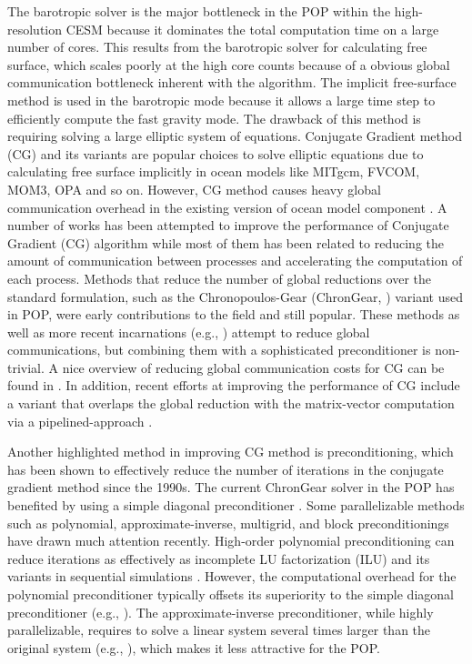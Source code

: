 
The barotropic solver is the major bottleneck in the POP within the high-resolution CESM because it dominates the total computation time on a large number of cores.
This results from the barotropic solver for calculating free surface, which scales poorly at the high core counts because of a obvious global communication bottleneck inherent with the algorithm.
The implicit free-surface method is used in the barotropic mode because it allows a large time step to efficiently compute the fast gravity mode.
The drawback of this method is requiring solving a large elliptic system of equations.
Conjugate Gradient method (CG) and its variants are popular choices to solve elliptic equations due to calculating free surface implicitly in ocean models like MITgcm\citep{adcroft2014mitgcm}, FVCOM\citep{lai2010nonhydrostatic}, MOM3\citep{pacanowsky1999mom3}, OPA \citep{madec1997ocean} and so on.
However, CG method causes heavy global communication overhead in the existing version of ocean model component \citep{Worley:2011:PCE:2063384.2063457}.
A number of works has been attempted to improve the performance of Conjugate Gradient (CG) algorithm while most of them has been related to reducing the amount of communication between processes and accelerating the computation of each process.
Methods that reduce the number of global reductions over the standard formulation, such as the Chronopoulos-Gear (ChronGear, \cite{dAzevedo1999lapack}) variant used in POP, were early contributions to the field and still popular.
These methods as well as more recent incarnations (e.g.,  \cite{hoemmen2010}) attempt to reduce global communications, but combining them with a sophisticated preconditioner is non-trivial. A nice overview of reducing global communication costs for CG can be found in \cite{ghysels2014}. In addition, recent efforts at improving the performance of CG include a variant that overlaps the global reduction with the matrix-vector computation via a pipelined-approach \citep{ghysels2014}.

Another highlighted method in improving CG method is preconditioning,
which has been shown to effectively reduce the number of iterations in the conjugate gradient method since the 1990s.
The current ChronGear solver in the POP has benefited by using a simple diagonal preconditioner \citep{pini1990simple, reddy2013comparison}.
Some parallelizable methods such as polynomial, approximate-inverse, multigrid, and block preconditionings have drawn much attention recently.
High-order polynomial preconditioning can reduce iterations as effectively as incomplete LU factorization (ILU) and its variants in sequential simulations \cite{benzi2002preconditioning}.
However, the computational overhead for the polynomial preconditioner typically offsets its superiority to the simple diagonal preconditioner (e.g., \cite{meyer1989numerical,smith1992parallel}).
The approximate-inverse preconditioner, while highly parallelizable, requires to solve a linear system several times larger than the original system (e.g., \cite{smith1992parallel,bergamaschi2007numerical}), which makes it less attractive for the POP.

